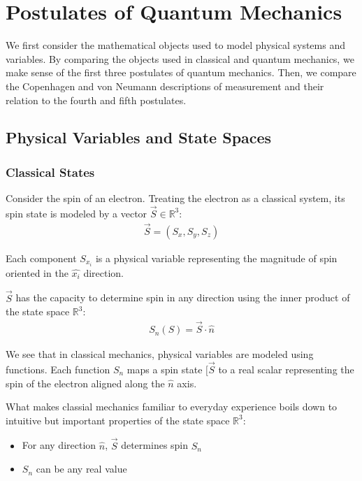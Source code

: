 \usetikzlibrary{shapes.geometric}
\usetikzlibrary{positioning}

\newcommand{\apparatus}[4]{\node[square node] (#1) at (#2,#3){#4};
                           \node[port] (#1+) at (#2 + 0.375, #3 + 0.5){+};
                           \node[port] (#1-) at (#2 + 0.375, #3 - 0.5){-};}

\chapter{Postulates of Quantum Mechanics}

We first consider the mathematical objects used to model physical systems and variables. By comparing the objects used in classical and quantum mechanics, we make sense of the first three postulates of quantum mechanics. Then, we compare the Copenhagen and von Neumann descriptions of measurement and their relation to the fourth and fifth postulates.

\section{Physical Variables and State Spaces}
\subsection{Classical States}
Consider the spin of an electron. Treating the electron as a classical system, its spin state is modeled by a vector $\vec{S} \in \mathbb{R}^3$:
\begin{align}
\vec{S} = (S_x, S_y, S_z)
\end{align}

Each component $S_{x_i}$ is a physical variable representing the magnitude of spin oriented in the $\hat{x_i}$ direction.

$\vec{S}$ has the capacity to determine spin in any direction using the inner product of the state space $\mathbb{R}^3$:
\begin{align}
S_n(S) = \vec{S} \cdot \hat{n}
\end{align}

We see that in classical mechanics, physical variables are modeled using functions. Each function $S_n$ maps a spin state $[\vec{S}$ to a real scalar representing the spin of the electron aligned along the $\hat{n}$ axis.

What makes classial mechanics familiar to everyday experience boils down to intuitive but important properties of the state space $\mathbb{R}^3$:
\begin{itemize}
\item For any direction $\hat{n}$, $\vec{S}$ determines spin $S_n$
\item $S_n$ can be any real value
\end{itemize}

